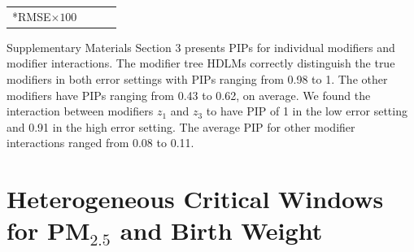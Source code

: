 \documentclass[12pt]{article}
\begin{document}
\begin{table}[!ht]
\begin{tabular}{lrrrrrrrrrcc}
        
        \bottomrule[2pt]
        \multicolumn{9}{l}{*RMSE$\times100$}\\
    \end{tabular}
\end{table}

Supplementary Materials Section 3 presents PIPs for individual modifiers and modifier interactions. The modifier tree HDLMs correctly distinguish the true modifiers in both error settings with PIPs ranging from 0.98 to 1. The other modifiers have PIPs ranging from 0.43 to 0.62, on average. We found the interaction between modifiers $z_1$ and $z_3$ to have PIP of 1 in the low error setting and 0.91 in the high error setting. The average PIP for other modifier interactions ranged from 0.08 to 0.11.


\section{Heterogeneous Critical Windows for PM$_{2.5}$ and Birth Weight}\label{sec:data_analysis}



\end{document}
